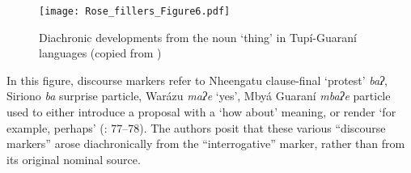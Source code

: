 \documentclass[output=paper]{langscibook}
\begin{document}
\begin{figure}
\texttt{[image: Rose\_fillers\_Figure6.pdf]}
\caption{\label{fig:rose:6}Diachronic developments from the noun ‘thing’ in Tupí-Guaraní languages (copied from \citealt[90]{AuweraAuwera2021})}
\end{figure}

% 

In this figure, discourse markers refer to Nheengatu clause-final ‘protest’ \textit{baʔ}, Siriono \textit{ba} surprise particle, Warázu \textit{maʔe} ‘yes’, Mbyá Guaraní \textit{mbaʔe} particle used to either introduce a proposal with a ‘how about’ meaning, or render ‘for example, perhaps’ (\citealt{AuweraAuwera2021}: 77--78). The authors posit that these various “discourse markers” arose diachronically from the “interrogative” marker, rather than from its original nominal source.
\end{document}
